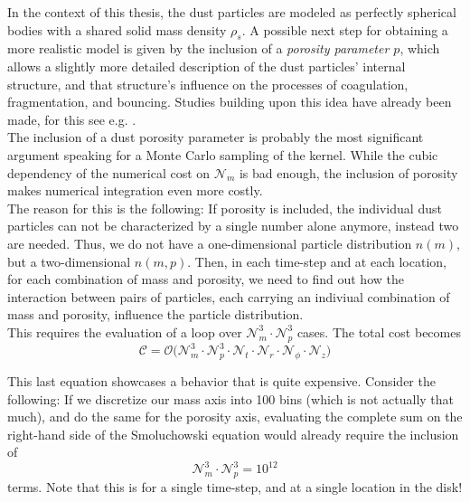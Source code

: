 
    In the context of this thesis, the dust particles are modeled as perfectly spherical bodies 
    with a shared solid mass density $\rho_s$. A possible next step for obtaining a more realistic
    model is given by the inclusion of a \textit{porosity parameter $p$}, which allows a 
    slightly more detailed description of the dust particles' internal structure, and that 
    structure's influence on the processes of coagulation, fragmentation, and bouncing. 
    Studies building upon this idea have already been made, for this see e.g. 
    \cite{ormel_2006} \cite{katakoa_2017}. \\

    The inclusion of a dust porosity parameter is probably the most significant argument speaking 
    for a Monte Carlo sampling of the kernel. While the cubic dependency of the numerical cost on 
    $\mathcal N_m$ is bad enough, the inclusion of porosity makes numerical integration even more 
    costly. \\

    The reason for this is the following: If porosity is included, the individual dust particles 
    can not be characterized by a single number alone anymore, instead two are needed. Thus, we 
    do not have a one-dimensional particle distribution $n(m)$, but a two-dimensional $n(m, p)$.
    Then, in each time-step and at each location, for each combination of mass and porosity, we 
    need to find out how the interaction between pairs of particles, each carrying an indiviual 
    combination of mass and porosity, influence the particle distribution. \\

    This requires the evaluation of a loop over $\mathcal N_m^3 \cdot \mathcal N_p^3$ cases.
    The total cost becomes 
    \begin{equation}
        \mathcal C = \mathcal O\big( 
            \mathcal N_m^3 \cdot 
            \mathcal N_p^3 \cdot 
            \mathcal N_t \cdot 
            \mathcal N_r \cdot \mathcal N_\phi \cdot \mathcal N_z
        \big)
    \end{equation}

    This last equation showcases a behavior that is quite expensive. Consider the following: 
    If we discretize our mass axis into 100 bins (which is not actually that much), and do the 
    same for the porosity axis, evaluating the complete sum on the right-hand side of the 
    Smoluchowski equation would already require the inclusion of
    \begin{equation}
        \mathcal N_m^3 \cdot \mathcal N_p^3 = 10^{12}
    \end{equation}
    terms. Note that this is for a single time-step, and at a single location in the disk! \\

